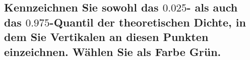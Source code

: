 \documentclass[12pt,a4paper]{article}
\begin{document}
\hypertarget{kennzeichnen-sie-sowohl-das-0.025--als-auch-das-0.975-quantil-der-theoretischen-dichte-in-dem-sie-vertikalen-an-diesen-punkten-einzeichnen.-wuxe4hlen-sie-als-farbe-gruxfcn.}{%
\subsection{\texorpdfstring{Kennzeichnen Sie sowohl das \(0.025\)- als
auch das \(0.975\)-Quantil der theoretischen Dichte, in dem Sie
Vertikalen an diesen Punkten einzeichnen. Wählen Sie als Farbe
Grün.}{Kennzeichnen Sie sowohl das 0.025- als auch das 0.975-Quantil der theoretischen Dichte, in dem Sie Vertikalen an diesen Punkten einzeichnen. Wählen Sie als Farbe Grün.}}\label{kennzeichnen-sie-sowohl-das-0.025--als-auch-das-0.975-quantil-der-theoretischen-dichte-in-dem-sie-vertikalen-an-diesen-punkten-einzeichnen.-wuxe4hlen-sie-als-farbe-gruxfcn.}}
\end{document}
